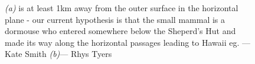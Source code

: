 \begin{figure}[t!]
\checkoddpage \ifoddpage \forcerectofloat \else \forceversofloat \fi
\centering
\begin{subfigure}{0.47\textwidth}
\end{subfigure}
\hfill
\begin{subfigure}{0.51\textwidth}
\end{subfigure}
\vspace{15pt}
\caption{\emph{(a)} \protect{} is at least 1km away from the outer surface in the horizontal plane - our current hypothesis is that the small mammal is a dormouse who entered somewhere below the Sheperd's Hut and made its way along the horizontal passages leading to Hawaii eg. \protect{}--- Kate Smith 
\emph{(b)}--- Rhys Tyers }
\label{path below Kal}
\end{figure}

